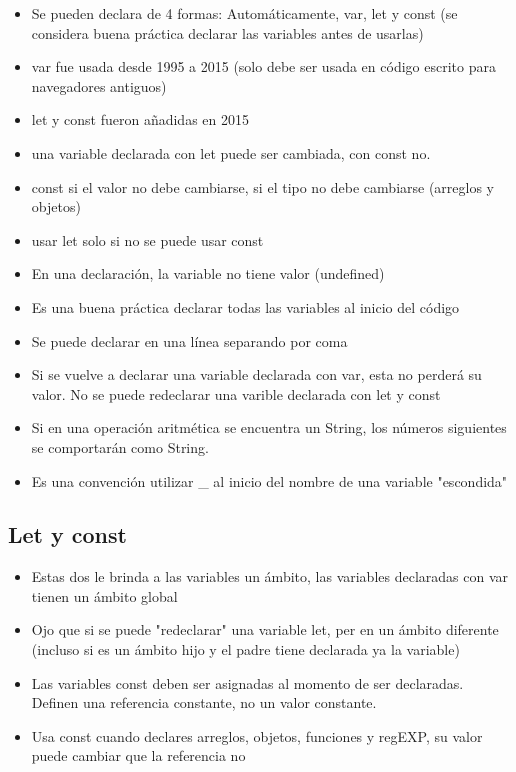 \documentclass{article}
\begin{document}
 \begin{itemize}
   \item Se pueden declara de 4 formas: Automáticamente, var, let y const (se considera buena práctica declarar las variables antes de usarlas)
   \item var fue usada desde 1995 a 2015 (solo debe ser usada en código escrito para navegadores antiguos)
   \item let y const fueron añadidas en 2015
   \item una variable declarada con let puede ser cambiada, con const no.
   \item const si el valor no debe cambiarse, si el tipo no debe cambiarse (arreglos y objetos)
   \item usar let solo si no se puede usar const
   \item En una declaración, la variable no tiene valor (undefined)
   \item Es una buena práctica declarar todas las variables al inicio del código
   \item Se puede declarar en una línea separando por coma
   \item Si se vuelve a declarar una variable declarada con var, esta no perderá su valor. No se puede redeclarar una varible declarada con let y const
   \item Si en una operación aritmética se encuentra un String, los números siguientes se comportarán como String.
   \item Es una convención utilizar \_ al inicio del nombre de una variable "escondida"
 \end{itemize}

 \subsection{Let y const}

 \begin{itemize}
   \item Estas dos le brinda a las variables un ámbito, las variables declaradas con var tienen un ámbito global
   \item Ojo que si se puede "redeclarar" una variable let, per en un ámbito diferente (incluso si es un ámbito hijo y el padre tiene declarada ya la variable)
   \item Las variables const deben ser asignadas al momento de ser declaradas. Definen una referencia constante, no un valor constante.
   \item Usa const cuando declares arreglos, objetos, funciones y regEXP, su valor puede cambiar que la referencia no
 \end{itemize}
\end{document}
